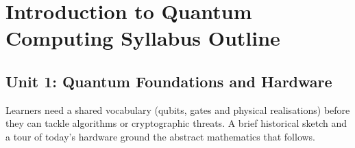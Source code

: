 \section{Introduction to Quantum Computing Syllabus Outline}







\subsection{Unit 1: Quantum Foundations and Hardware}



Learners need a shared vocabulary (qubits, gates and physical realisations) before they can tackle algorithms or cryptographic threats. 
A brief historical sketch and a tour of today's hardware ground the abstract mathematics that follows.

